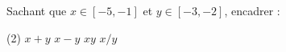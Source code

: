 %
%
	Sachant que $x \in [-5,-1]$ et $y \in [-3,-2]$, encadrer :
	\begin{tasks}(2)
		\task  $x+y$
		\task  $x-y$
		\task  $xy$
		\task  $x/y$
	\end{tasks}
